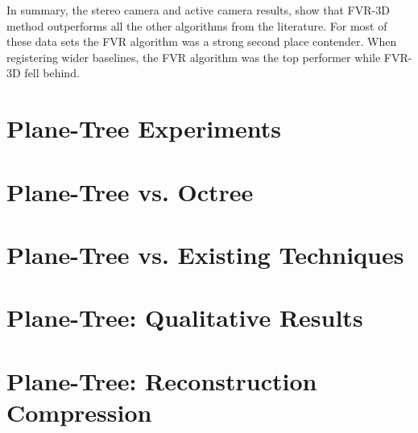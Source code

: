 \begin{table}[h]
\centering
\caption{FVR Comparison Table \label{tab:GridRT}}
\label{tab:ExperimentsBooleanSummary}
\end{table}


In summary, the stereo camera and active camera results, show that FVR-3D method outperforms all the other algorithms from the literature. For most of these data sets the FVR algorithm was a strong second place contender. When registering wider baselines, the FVR algorithm was the top performer while FVR-3D fell behind.

\section{Plane-Tree Experiments}

\section{Plane-Tree vs. Octree}
\label{SEC:PTVSOT}

\section{Plane-Tree vs. Existing Techniques}
\label{SEC:PTVSSOTA}

\section{Plane-Tree: Qualitative Results}
\label{SEC:PTQUALEVAL}

\section{Plane-Tree: Reconstruction Compression}
\label{SEC:PTONRECON}




